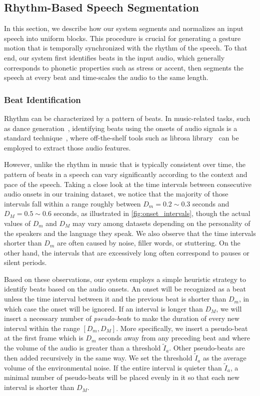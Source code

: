 \subsection{Rhythm-Based Speech Segmentation}
\label{subsec:beat_alignment}
In this section, we describe how our system segments and normalizes an input speech into uniform blocks. This procedure is crucial for generating a gesture motion that is temporally synchronized with the rhythm of the speech. To that end, our system first identifies beats in the input audio, which generally corresponds to phonetic properties such as stress or accent, then segments the speech at every beat and time-scales the audio to the same length.

\subsubsection{Beat Identification}
\label{subsubsec:onset_identification}
Rhythm can be characterized by a pattern of beats. In music-related tasks, such as dance generation~\cite{chen2021choreomaster,aristidou2021rhythm}, identifying beats using the onsets of audio signals is a standard technique~\cite{bello2005onsetTutorial,ellis2007beat}, where off-the-shelf tools such as librosa library~\cite{mcfee2015librosa} can be employed to extract those audio features.

However, unlike the rhythm in music that is typically consistent over time, the pattern of beats in a speech can vary significantly according to the context and pace of the speech. Taking a close look at the time intervals between consecutive audio onsets in our training dataset, we notice that the majority of those intervals fall within a range roughly between $D_m=0.2\sim{}0.3$ seconds and $D_M=0.5\sim{}0.6$ seconds, as illustrated in \fig\ref{fig:onset_intervals}, though the actual values of $D_m$ and $D_M$ may vary among datasets depending on the personality of the speakers and the language they speak. We also observe that the time intervals shorter than $D_m$ are often caused by noise, filler words, or stuttering. On the other hand, the intervals that are excessively long often correspond to pauses or silent periods.

Based on these observations, our system employs a simple heuristic strategy to identify beats based on the audio onsets. An onset will be recognized as a beat unless the time interval between it and the previous beat is shorter than $D_m$, in which case the onset will be ignored. If an interval is longer than $D_M$, we will insert a necessary number of \emph{pseudo-beat}s to make the duration of every new interval within the range $[D_m, D_M]$. More specifically, we insert a pseudo-beat at the first frame which is $D_m$ seconds away from any preceding beat and where the volume of the audio is greater than a threshold $\tilde{I}_a$. Other pseudo-beats are then added recursively in the same way. We set the threshold $\tilde{I}_a$ as the average volume of the environmental noise. If the entire interval is quieter than $\tilde{I}_a$, a minimal number of pseudo-beats will be placed evenly in it so that each new interval is shorter than $D_M$.

